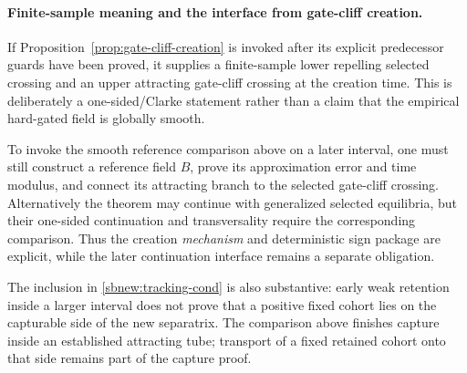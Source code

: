 \documentclass{article} %
\theoremstyle{plain}
\theoremstyle{definition}
\theoremstyle{remark}
\begin{document}
\paragraph{Finite-sample meaning and the interface from gate-cliff creation.}
If Proposition~\ref{prop:gate-cliff-creation} is invoked after its explicit
predecessor guards have been proved, it supplies a finite-sample lower
repelling selected crossing and an upper attracting gate-cliff crossing at
the creation time. This is deliberately a one-sided/Clarke statement rather
than a claim that the empirical hard-gated field is globally smooth.

To invoke the smooth reference comparison above on a later interval, one
must still construct a reference field $B$, prove its approximation error and
time modulus, and connect its attracting branch to the selected gate-cliff
crossing. Alternatively the theorem may continue with generalized selected
equilibria, but their one-sided continuation and transversality require the
corresponding comparison. Thus the creation \emph{mechanism} and deterministic
sign package are explicit, while the later continuation interface remains a
separate obligation.

The inclusion in \eqref{sbnew:tracking-cond} is also substantive: early weak
retention inside a larger interval does not prove that a positive fixed cohort
lies on the capturable side of the new separatrix. The comparison above
finishes capture inside an established attracting tube; transport of a fixed
retained cohort onto that side remains part of the capture proof.
\end{document}
